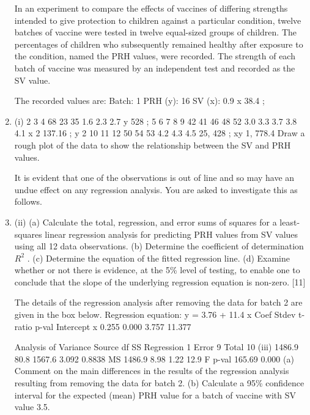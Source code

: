\documentclass[a4paper,12pt]{article}
\begin{document}
\begin{enumerate}
In an experiment to compare the effects of vaccines of differing strengths intended to give protection to children against a particular condition, twelve batches of vaccine
were tested in twelve equal-sized groups of children. The percentages of children who subsequently remained healthy after exposure to the condition, named the PRH
values, were recorded. The strength of each batch of vaccine was measured by an independent test and recorded as the SV value.


The recorded values are:
Batch:
1
PRH (y): 16
SV (x):
0.9
x 38.4 ;
\item (i)
2
3
4
68 23 35
1.6 2.3 2.7
y
528 ;
5
6
7
8
9
42 41 46 48 52
3.0 3.3 3.7 3.8 4.1
x 2 137.16 ;
y 2
10 11 12
50 54 53
4.2 4.3 4.5
25, 428 ;
xy 1, 778.4
Draw a rough plot of the data to show the relationship between the SV and PRH values.

It is evident that one of the observations is out of line and so may have an undue effect on any regression analysis. You are asked to investigate this as follows.
\item (ii)
(a) Calculate the total, regression, and error sums of squares for a least- squares linear regression analysis for predicting PRH values from SV
values using all 12 data observations.
(b) Determine the coefficient of determination $R^2$ .
(c) Determine the equation of the fitted regression line.
(d) Examine whether or not there is evidence, at the 5\% level of testing, to enable one to conclude that the slope of the underlying regression equation is non-zero.
[11]

The details of the regression analysis after removing the data for batch 2 are given in
the box below.
Regression equation: y = 3.76 + 11.4 x
Coef
Stdev
t-ratio p-val
Intercept
x 0.255
0.000
3.757
11.377

Analysis of Variance
Source
df
SS
Regression 1
Error
9
Total
10
(iii)
1486.9
80.8
1567.6
3.092
0.8838
MS
1486.9
8.98
1.22
12.9
F p-val
165.69 0.000
(a) Comment on the main differences in the results of the regression analysis resulting from removing the data for batch 2.
(b) Calculate a 95\% confidence interval for the expected (mean) PRH value for a batch of vaccine with SV value 3.5.

\end{enumerate}

\newpage
\end{document}
